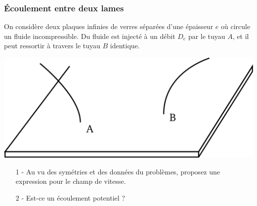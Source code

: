 \documentclass{report}
\begin{document}
\subsubsection*{Écoulement entre deux lames}

On considère deux plaques infinies de verres séparées d'une épaisseur $e$ où circule un fluide incompressible. Du fluide est injecté à un débit $D_e$ par le tuyau $A$, et il peut ressortir à travers le tuyau $B$ identique. 

\begin{center}
	\includegraphics[scale=0.3]{plaque.pdf}
\end{center}

\begin{itemize}
	\item[1 - ] Au vu des symétries et des données du problèmes, proposez une expression pour le champ de vitesse. 
	\item[2 - ] Est-ce un écoulement potentiel ?
\end{itemize}
\end{document}
